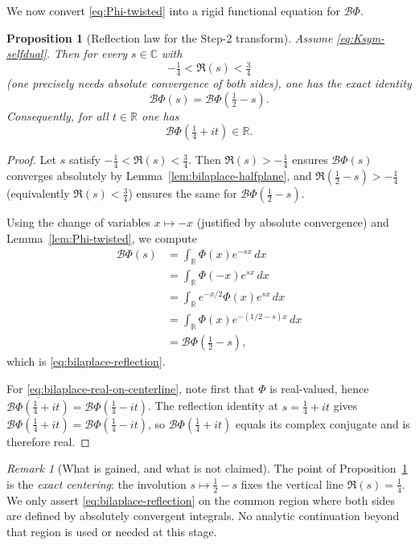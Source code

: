 \documentclass[12pt]{amsart}
\newtheorem{proposition}[theorem]{Proposition}
\theoremstyle{definition}
\theoremstyle{remark}
\newtheorem{remark}[theorem]{Remark}
\begin{document}
We now convert \eqref{eq:Phi-twisted} into a rigid functional equation for $\mathcal B\Phi$.

\begin{proposition}[Reflection law for the Step-2 transform]
\label{prop:bilaplace-reflection}
Assume \eqref{eq:Ksym-selfdual}. Then for every $s\in\mathbb C$ with
\[
-\tfrac14<\Re(s)<\tfrac34
\]
(one precisely needs absolute convergence of both sides), one has the exact identity
\begin{equation}
\label{eq:bilaplace-reflection}
\mathcal B\Phi(s)=\mathcal B\Phi\!\left(\tfrac12-s\right).
\end{equation}
Consequently, for all $t\in\mathbb R$ one has
\begin{equation}
\label{eq:bilaplace-real-on-centerline}
\mathcal B\Phi\!\left(\tfrac14+it\right)\in\mathbb R.
\end{equation}
\end{proposition}

\begin{proof}
Let $s$ satisfy $-\tfrac14<\Re(s)<\tfrac34$. Then $\Re(s)>-\tfrac14$ ensures
$\mathcal B\Phi(s)$ converges absolutely by Lemma~\ref{lem:bilaplace-halfplane}, and
$\Re(\tfrac12-s)>-\tfrac14$ (equivalently $\Re(s)<\tfrac34$) ensures the same for
$\mathcal B\Phi(\tfrac12-s)$.

Using the change of variables $x\mapsto -x$ (justified by absolute convergence) and
Lemma~\ref{lem:Phi-twisted}, we compute
\begin{align*}
\mathcal B\Phi(s)
&= \int_{\mathbb R}\Phi(x)e^{-sx}\,dx \\
&= \int_{\mathbb R}\Phi(-x)e^{sx}\,dx \\
&= \int_{\mathbb R}e^{-x/2}\Phi(x)e^{sx}\,dx \\
&= \int_{\mathbb R}\Phi(x)e^{-(1/2-s)x}\,dx \\
&= \mathcal B\Phi\!\left(\tfrac12-s\right),
\end{align*}
which is \eqref{eq:bilaplace-reflection}.


For \eqref{eq:bilaplace-real-on-centerline}, note first that $\Phi$ is real-valued, hence
$\overline{\mathcal B\Phi(\tfrac14+it)}=\mathcal B\Phi(\tfrac14-it)$. The reflection identity
at $s=\tfrac14+it$ gives $\mathcal B\Phi(\tfrac14+it)=\mathcal B\Phi(\tfrac14-it)$, so
$\mathcal B\Phi(\tfrac14+it)$ equals its complex conjugate and is therefore real.
\end{proof}

\begin{remark}[What is gained, and what is not claimed]
The point of Proposition~\ref{prop:bilaplace-reflection} is the \emph{exact centering}:
the involution $s\mapsto \tfrac12-s$ fixes the vertical line $\Re(s)=\tfrac14$.
We only assert \eqref{eq:bilaplace-reflection} on the common region where both sides are
defined by absolutely convergent integrals. No analytic continuation beyond that region is
used or needed at this stage.
\end{remark}
\end{document}
